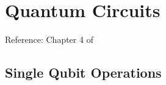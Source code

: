 \documentclass[main.tex]{subfiles}
\begin{document}
%
%
%
%
%
%
%
%
%
%
%
%
%

\section{Quantum Circuits}
Reference: Chapter 4 of \cite{nielsen2010quantum}

\subsection{Single Qubit Operations}
\end{document}
